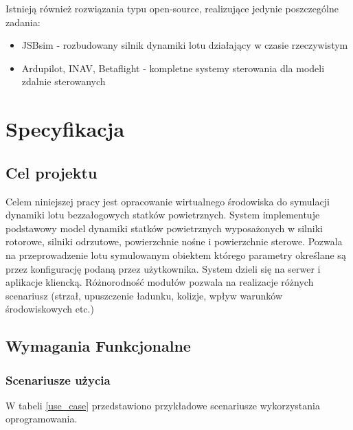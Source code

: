 \documentclass[15pt]{sprawozdanie}
\begin{document}
Istnieją również rozwiązania typu open-source, realizujące jedynie poszczególne zadania:

\begin{itemize}
\item JSBsim - rozbudowany silnik dynamiki lotu działający w czasie rzeczywistym  
\item Ardupilot, INAV, Betaflight - kompletne systemy sterowania dla modeli zdalnie sterowanych
\end{itemize}



\color{orange}


\section{Specyfikacja}


\subsection{Cel projektu}

Celem niniejszej pracy jest opracowanie wirtualnego środowiska do symulacji dynamiki lotu bezzałogowych statków powietrznych. System implementuje podstawowy model dynamiki statków powietrznych wyposażonych w silniki rotorowe, silniki odrzutowe, powierzchnie nośne i powierzchnie sterowe. Pozwala na przeprowadzenie lotu symulowanym obiektem którego parametry określane są przez konfigurację podaną przez użytkownika. System dzieli się na serwer i aplikacje kliencką. Różnorodność modułów pozwala na realizacje różnych scenariusz (strzał, upuszczenie ładunku, kolizje, wpływ warunków środowiskowych etc.)

\subsection{Wymagania Funkcjonalne}

\subsubsection{Scenariusze użycia}

W tabeli \ref{use_case} przedstawiono przykładowe scenariusze wykorzystania oprogramowania.
\end{document}
